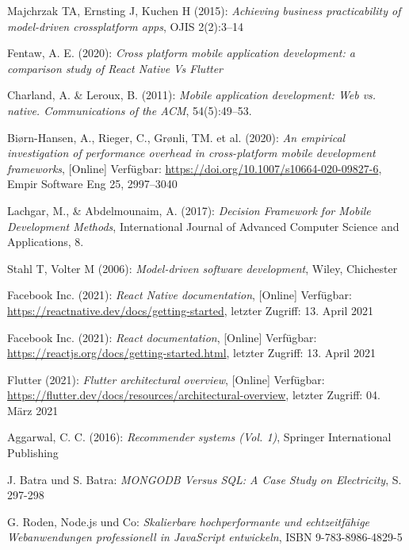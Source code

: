 \documentclass[11pt,a4paper]{article}
\begin{document}
\begin{itemize}
 Majchrzak TA, Ernsting J, Kuchen H (2015): \textit{Achieving business practicability of model-driven crossplatform apps}, OJIS 2(2):3–14

 Fentaw, A. E. (2020): \textit{Cross platform mobile application development: a comparison study of React Native Vs Flutter}


 Charland, A. \& Leroux, B. (2011): \textit{Mobile application development: Web vs. native. Communications of the ACM}, 54(5):49–53.

 Biørn-Hansen, A., Rieger, C., Grønli, TM. et al. (2020): \textit{An empirical investigation of performance overhead in cross-platform mobile development frameworks}, [Online] Verfügbar: \url{https://doi.org/10.1007/s10664-020-09827-6}, Empir Software Eng 25, 2997–3040


 Lachgar, M., \& Abdelmounaim, A. (2017): \textit{Decision Framework for Mobile Development Methods}, International Journal of Advanced Computer Science and Applications, 8.


 Stahl T, Volter M (2006): \textit{Model-driven software development}, Wiley, Chichester

 Facebook Inc. (2021): \textit{React Native documentation}, [Online] Verfügbar: \url{https://reactnative.dev/docs/getting-started}, letzter Zugriff: 13. April 2021


 Facebook Inc. (2021): \textit{React documentation}, [Online] Verfügbar: \url{https://reactjs.org/docs/getting-started.html}, letzter Zugriff: 13. April 2021


 Flutter (2021): \textit{Flutter architectural overview}, [Online] Verfügbar: \url{https://flutter.dev/docs/resources/architectural-overview}, letzter Zugriff: 04. März 2021


 Aggarwal, C. C. (2016): \textit{Recommender systems (Vol. 1)}, Springer International Publishing



%
%
%
%


 J. Batra und S. Batra: \textit{MONGODB Versus SQL: A Case Study on Electricity}, S. 297-298

 G. Roden, Node.js und Co: \textit{Skalierbare hochperformante und echtzeitfähige Webanwendungen professionell in JavaScript entwickeln}, ISBN 9-783-8986-4829-5



\end{itemize}
\end{document}
